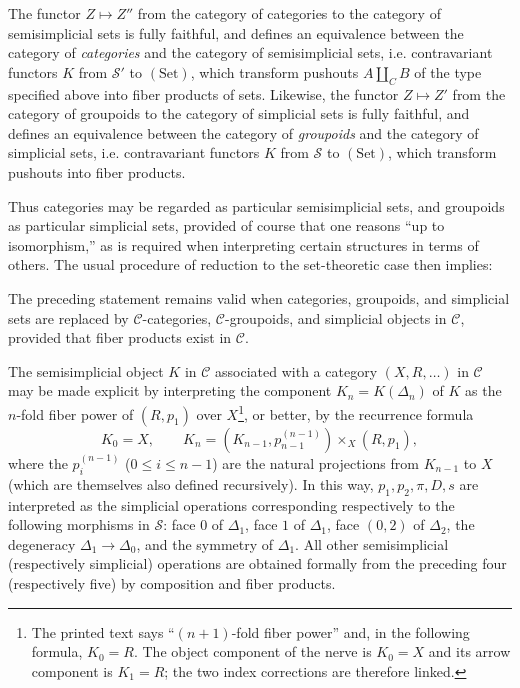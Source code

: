  The functor $Z\longmapsto Z''$ from the category of
categories to the category of semisimplicial sets is fully faithful, and
defines an equivalence between the category of \emph{categories} and the
category of semisimplicial sets, i.e. contravariant functors $K$ from
$\mathcal S'$ to $(\mathrm{Set})$, which transform pushouts $A\amalg_C B$ of
the type specified above into fiber products of sets. Likewise, the functor
$Z\longmapsto Z'$ from the category of groupoids to the category of
simplicial sets is fully faithful, and defines an equivalence between the
category of \emph{groupoids} and the category of
simplicial sets, i.e. contravariant functors $K$ from $\mathcal S$ to
$(\mathrm{Set})$, which transform pushouts into fiber products.

Thus categories may be regarded as particular semisimplicial sets, and
groupoids as particular simplicial sets, provided of course that one reasons
``up to isomorphism,'' as is required when interpreting certain structures in
terms of others. The usual procedure of reduction to the set-theoretic case
then implies:

 The preceding statement remains valid when categories,
groupoids, and simplicial sets are replaced by $\mathcal C$-categories,
$\mathcal C$-groupoids, and simplicial objects in $\mathcal C$, provided that
fiber products exist in $\mathcal C$.

The semisimplicial object $K$ in $\mathcal C$ associated with a category
$(X,R,\ldots)$ in $\mathcal C$ may be made explicit by interpreting the
component $K_n=K(\Delta_n)$ of $K$ as the $n$-fold fiber power of
$(R,p_1)$ over $X$\footnote{The printed text says
``$(n+1)$-fold fiber power'' and, in the following formula, $K_0=R$. The
object component of the nerve is $K_0=X$ and its arrow component is $K_1=R$;
the two index corrections are therefore linked.}, or better, by the
recurrence formula
\[
  K_0=X,\qquad
  K_n=(K_{n-1},p_{n-1}^{(n-1)})\times_X(R,p_1),
\]
where the $p_i^{(n-1)}$ ($0\leq i\leq n-1$) are the natural projections from
$K_{n-1}$ to $X$ (which are themselves also defined recursively). In this
way, $p_1,p_2,\pi,D,s$ are interpreted as the simplicial operations
corresponding respectively to the following morphisms in $\mathcal S$: face
$0$ of $\Delta_1$, face $1$ of $\Delta_1$, face $(0,2)$ of $\Delta_2$, the
degeneracy $\Delta_1\to\Delta_0$, and the symmetry of $\Delta_1$. All other
semisimplicial (respectively simplicial) operations are obtained formally from
the preceding four (respectively five) by composition and fiber products.

